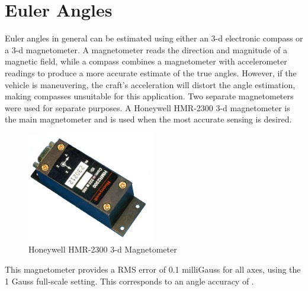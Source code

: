 \section{Euler Angles}
Euler angles in general can be estimated using either an 3-d electronic compass or a 3-d magnetometer. A magnetometer reads the direction and magnitude of a magnetic field, while a compass combines a magnetometer with accelerometer readings to produce a more accurate estimate of the true angles. However, if the vehicle is maneuvering, the craft's acceleration will distort the angle estimation, making compasses unsuitable for this application. Two separate magnetometers were used for separate purposes. A Honeywell HMR-2300 3-d magnetometer is the main magnetometer and is used when the most accurate sensing is desired.

\begin{figure}[H]
  \caption{Honeywell HMR-2300 3-d Magnetometer } \label{hmr23000Picture}
  \centering
    \includegraphics[width=0.5\textwidth]{figures/hmr2300.jpg}
\end{figure}

This magnetometer provides a RMS error of 0.1 milliGauss for all axes, using the 1 Gauss full-scale setting\cite{hmr2300DataSheet}. This corresponds to an angle accuracy of .

